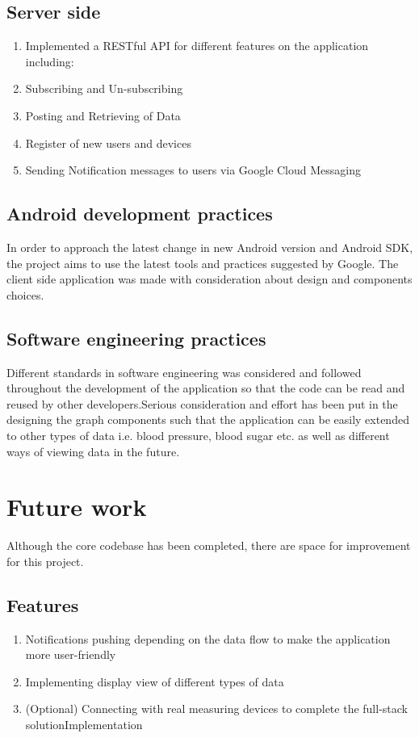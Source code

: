 \subsection{Server side}

\begin{enumerate}
    \item Implemented a RESTful API for different features on the application including:
    \item Subscribing and Un-subscribing
    \item Posting and Retrieving of Data
    \item Register of new users and devices
    \item Sending Notification messages to users via Google Cloud Messaging
\end{enumerate}

\subsection{Android development practices}
In order to approach the latest change in new Android version and Android SDK, the project aims to use the latest tools
and practices suggested by Google. The client side application was made with consideration about design and components
choices.

\subsection{Software engineering practices}
Different standards in software engineering was considered and followed throughout the development of the application so
that the code can be read and reused by other developers.Serious consideration and effort has been put in the designing
the graph components such that the application can be easily extended to other types of data i.e. blood pressure, blood
sugar etc. as well as different ways of viewing data in the future.

\section{Future work} \label{sec:Work done so far}
Although the core codebase has been completed, there are space for improvement for this project.
\subsection{Features}
\begin{enumerate}
    \item Notifications pushing depending on the data flow to make the application more
        user-friendly
    \item Implementing display view of different types of data
    \item (Optional) Connecting with real measuring devices
        to complete the full-stack solutionImplementation
\end{enumerate}

